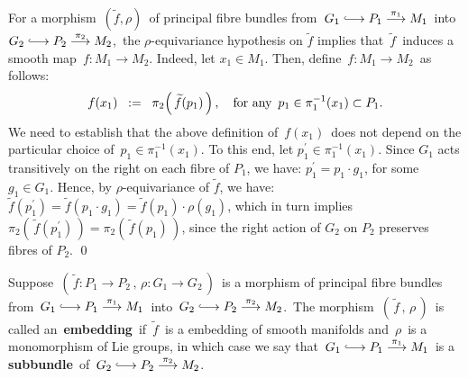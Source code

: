 
\begin{remark}
\mbox{}
\vskip 0.2cm
\noindent
	For a morphism \,$(\widetilde{f},\rho)$\, of principal fibre bundles from
	\,$G_{1} \longhookrightarrow P_{1} \overset{\pi_{1}}{\longrightarrow} M_{1}$\,
	into
	\,$G_{2} \longhookrightarrow P_{2} \overset{\pi_{2}}{\longrightarrow} M_{2}$,\,
	the $\rho$-equivariance hypothesis on $\widetilde{f}$ implies that
	\,$\widetilde{f}$\, induces a smooth map \,$f : M_{1} \longrightarrow M_{2}$.
	\vskip 0.2cm
	\proof
	Indeed, let $x_{1} \in M_{1}$. Then, define \,$f : M_{1} \longrightarrow M_{2}$\, as follows:
	\begin{equation*}
	f(x_{1}) \;\; := \;\; \pi_{2}\!\left(\,\widetilde{f}(p_{1})\,\right),
	\quad
	\textnormal{for any \,$p_{1} \in \pi_{1}^{-1}(x_{1}) \subset P_{1}$}.
	\end{equation*}
	We need to establish that the above definition of \,$f(x_{1})$\, does not depend on the
	particular choice of \,$p_{1} \in \pi_{1}^{-1}(x_{1})$.
	To this end, let $p_{1}^{\prime} \in \pi_{1}^{-1}(x_{1})$.
	Since $G_{1}$ acts transitively on the right on each fibre of $P_{1}$, we have:
	$p_{1}^{\prime} = p_{1} \cdot g_{1}$, for some $g_{1} \in G_{1}$.
	Hence, by $\rho$-equivariance of $\widetilde{f}$, we have:
	$\widetilde{f}(p_{1}^{\prime}) = \widetilde{f}(p_{1}\cdot g_{1}) = \widetilde{f}(p_{1})\cdot\rho(g_{1})$,
	which in turn implies
	$\pi_{2}\!\left(\,\widetilde{f}(p_{1}^{\prime})\,\right) = \pi_{2}\!\left(\,\widetilde{f}(p_{1})\,\right)$,
	since the right action of $G_{2}$ on $P_{2}$ preserves fibres of $P_{2}$.	
	\qed
\end{remark}


\vskip 0.5cm
\begin{definition}
\mbox{}
\vskip 0.2cm
\noindent
Suppose
\,$\left(\,\widetilde{f}:P_{1}\longrightarrow P_{2}\,,\,\rho:G_{1}\longrightarrow G_{2}\,\right)$\,
is a morphism of principal fibre bundles from
\,$G_{1} \longhookrightarrow P_{1} \overset{\pi_{1}}{\longrightarrow} M_{1}$\,
into
\,$G_{2} \longhookrightarrow P_{2} \overset{\pi_{2}}{\longrightarrow} M_{2}$.\,
	The morphism
	\,$\left(\,\widetilde{f}\,,\,\rho\,\right)$\,
	is called an \,\textbf{embedding}\,
	if \,$\widetilde{f}$\, is a embedding of smooth manifolds and
	\,$\rho$\, is a monomorphism of Lie groups, in which case we say that
	\,$G_{1} \longhookrightarrow P_{1} \overset{\pi_{1}}{\longrightarrow} M_{1}$\,
	is a \,\textbf{subbundle}\, of
	\,$G_{2} \longhookrightarrow P_{2} \overset{\pi_{2}}{\longrightarrow} M_{2}$.\,
\end{definition}

